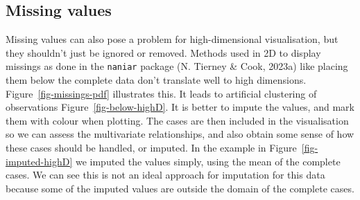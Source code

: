 \documentclass[
  letterpaper,
]{krantz}
\begin{document}
\subsection{Missing values}\label{missing-values}

Missing values can also pose a problem for high-dimensional
visualisation, but they shouldn't just be ignored or removed. Methods
used in 2D to display missings as done in the \texttt{naniar} package
(N. Tierney \& Cook, 2023a) like placing them below the complete data
don't translate well to high dimensions. Figure~\ref{fig-missings-pdf}
illustrates this. It leads to artificial clustering of observations
Figure~\ref{fig-below-highD}. It is better to impute the values, and
mark them with colour when plotting. The cases are then included in the
visualisation so we can assess the multivariate relationships, and also
obtain some sense of how these cases should be handled, or imputed. In
the example in Figure~\ref{fig-imputed-highD} we imputed the values
simply, using the mean of the complete cases. We can see this is not an
ideal approach for imputation for this data because some of the imputed
values are outside the domain of the complete cases.
\end{document}
